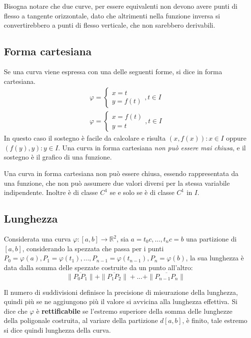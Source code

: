 Bisogna notare che due curve, per essere equivalenti non devono avere punti di flesso a tangente orizzontale, dato che altrimenti nella funzione inversa si convertirebbero a punti di flesso verticale, che non sarebbero derivabili.

\subsection{Forma cartesiana}
Se una curva viene espressa con una delle seguenti forme, si dice in forma cartesiana.
\begin{gather}
	\varphi = \begin{cases} x = t \\ y = f(t) \end{cases}, t\in I \\
	\varphi = \begin{cases} x = f(t) \\ y = t \end{cases}, t\in I 
\end{gather}
In questo caso il sostegno è facile da calcolare e risulta ${(x, f(x)) : x\in I}$ oppure ${(f(y), y) : y \in I}$. Una curva in forma cartesiana \emph{non può essere mai chiusa}, e il sostegno è il grafico di una funzione.

\begin{observation}
Una curva in forma cartesiana non può essere chiusa, essendo rappresentata da una funzione, che non può assumere due valori diversi per la stessa variabile indipendente.	 Inoltre è di classe $C^1$ se e solo se è di classe $C^1$ in $I$.
\end{observation}


\subsection{Lunghezza}
Considerata una curva $\varphi : [a, b] \rightarrow \mathbb{R}^2$, sia $a=t_0c, ..., t_nc=b$ una partizione di $[a, b]$, considerando la spezzata che passa per i punti $P_0=\varphi(a), P_1=\varphi(t_1), ..., P_{n-1}=\varphi(t_{n-1}), P_n=\varphi(b)$, la sua lunghezza è data dalla somma delle spezzate costruite da un punto all'altro:
\[
	\| \overline{P_0P_1}\|+ \|\overline{P_1P_2}\| + ... + \|\overline{P_{n-1}P_n}\|
\]

Il numero di suddivisioni definisce la precisione di misurazione della lunghezza, quindi più se ne aggiungono più il valore si avvicina alla lunghezza effettiva. Si dice che $\varphi$ è \textbf{rettificabile} se l'estremo superiore della somma delle lunghezze della poligonale costruita, al variare della partizione $d[a, b]$, è finito, tale estremo si dice quindi lunghezza della curva.

